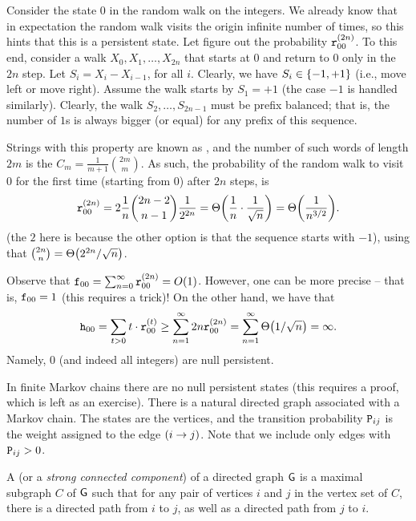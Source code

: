 \begin{example}
    Consider the state $0$ in the random walk on the integers. We
    already know that in expectation the random walk visits the origin
    infinite number of times, so this hints that this is a persistent
    state. Let figure out the probability $ \mathtt{r}_{00}^{(2n)}$. To
    this end, consider a walk $X_0, X_1, \ldots, X_{2n}$ that starts
    at $0$ and return to $0$ only in the $2n$ step.  Let
    $S_i = X_i - X_{i-1}$, for all $i$.  Clearly, we have
    $S_i \in \left\{ {-1, +1} \right\}$ (i.e., move left or move right).  Assume
    the walk starts by $S_1 = +1$ (the case $-1$ is handled
    similarly). Clearly, the walk $S_{2}, \ldots, S_{2n-1}$ must be
    prefix balanced; that is, the number of $1$s is always bigger (or
    equal) for any prefix of this sequence.
    
    Strings with this property are known as , and
    the number of such words of length $2m$ is the  $C_{m} = \frac{1}{m+1} \binom{2m}{m}$. As such, the
    probability of the random walk to visit $0$ for the first time
    (starting from $0$) after $2n$ steps, is
    \begin{equation*}
        \MCFPrbT{0}{0}{2n} = {2 \frac{1}{n} \binom{2n - 2}{n-1}
        }\frac{1}{2^{2n}} = \Theta\pth{ \frac{1}{n} \cdot
           \frac{1}{\sqrt{n}} } = \Theta \pth{ \frac{1}{n^{3/2}}} .
    \end{equation*}
    (the $2$ here is because the other option is that the sequence
    starts with $-1$), using that $\binom{2n}{n} = \Theta\pth{ 2^{2n}
       / \sqrt{n}}$.

    Observe that
    $\mathtt{f}_{00}= \sum_{n=0}^\infty \mathtt{r}_{00}^{(2n)} =
    O(1)$. However, one can be more precise -- that is,
    $\mathtt{f}_{00}=1$ (this requires a trick)! On the other hand,
    we have that
    \begin{equation*}
        \MCExSteps{0}{0} = \sum_{t >0} t\cdot \MCFPrbT{0}{0}{t} \geq %
        \sum_{n=1}^\infty 2n \MCFPrbT{0}{0}{2n}%
        =%
        \sum_{n=1}^{\infty} \Theta\pth{ 1/\sqrt{n}} = \infty.
    \end{equation*}
    Namely, $0$ (and indeed all integers) are null persistent.
\end{example}

In finite Markov chains there are no null persistent states (this
requires a proof, which is left as an exercise).  There is a natural
directed graph associated with a Markov chain. The states are the
vertices, and the transition probability $\mathtt{P}_{ij}$ is the weight
assigned to the edge $\left({{i} \rightarrow {j}} \right)$. Note that we include only edges
with $\mathtt{P}_{ij} > 0$.
\begin{defn}
    A  (or a \emph{strong connected
       component}) of a directed graph $\mathsf{G}$ is a maximal subgraph
    $C$ of $\mathsf{G}$ such that for any pair of vertices $i$ and $j$ in
    the vertex set of $C$, there is a directed path from $i$ to $j$,
    as well as a directed path from $j$ to $i$.
\end{defn}


